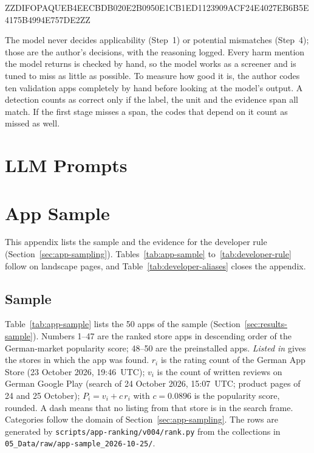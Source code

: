 \documentclass[twoside,its]{bossthesis}
\begin{document}
ZZDIFOPAQUEB4EECBDB020E2B0950E1CB1ED1123909ACF24E4027EB6B5E4175B4994E757DE2ZZ



The model never decides applicability (Step~1) or potential mismatches
(Step~4); those are the author's decisions, with the reasoning logged. Every
harm mention the model returns is checked by hand, so the model works as a
screener and is tuned to miss as little as possible. To measure how good it
is, the author codes ten validation apps completely by hand before looking at
the model's output. A detection counts as correct only if the label, the unit
and the evidence span all match. If the first stage misses a span, the codes
that depend on it count as missed as well.



\chapter{LLM Prompts}
\label{app:prompts}



\chapter{App Sample}
\label{app:app-sample}
This appendix lists the sample and the evidence for the developer rule
(Section~\ref{sec:app-sampling}). Tables~\ref{tab:app-sample}
to~\ref{tab:developer-rule} follow on landscape pages, and
Table~\ref{tab:developer-aliases} closes the appendix.

\section{Sample}
Table~\ref{tab:app-sample} lists the 50 apps of the sample
(Section~\ref{sec:results-sample}). Numbers 1--47 are the ranked store apps in
descending order of the German-market popularity score; 48--50 are the
preinstalled apps. \emph{Listed in} gives the stores in which the app was found.
$r_i$ is the rating count of the German App Store (23 October 2026, 19:46~UTC);
$v_i$ is the count of written reviews on German Google Play (search of 24
October 2026, 15:07~UTC; product pages of 24 and 25 October); $P_i=v_i+c\,r_i$
with $c=0.0896$ is the popularity score, rounded. A dash means that no listing
from that store is in the search frame.
Categories follow the domain of Section~\ref{sec:app-sampling}. The rows are
generated by \texttt{scripts/app-ranking/v004/rank.py} from the collections in
\texttt{05\_Data/raw/app-sample\_2026-10-25/}.
\end{document}
